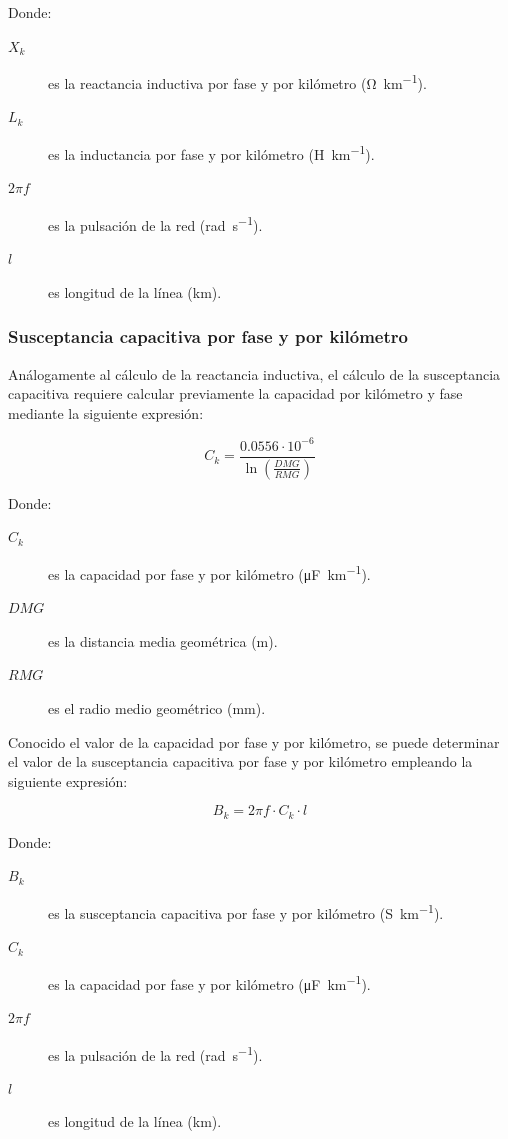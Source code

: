 Donde:
\begin{description}
  \item[$X_k$] es la reactancia inductiva por fase y por kilómetro (\si{\ohm\per\kilo\meter}).
  \item[$L_k$] es la inductancia por fase y por kilómetro (\si{\henry\per\kilo\meter}).
  \item[$2\pi f$] es la pulsación de la red (\si{\radian\per\second}).
  \item[$l$] es longitud de la línea (\si{\kilo\meter}).
\end{description}

\subsubsection{Susceptancia capacitiva por fase y por kilómetro}
\label{subsubsec:cdt-susceptancia}
Análogamente al cálculo de la reactancia inductiva, el cálculo de la susceptancia capacitiva requiere calcular previamente la capacidad por kilómetro y fase mediante la siguiente expresión:

\begin{equation}
\label{eq:cdt-capacidad}
C_k = \frac{0.0556 \cdot 10^{-6}}{\ln{(\frac{DMG}{RMG})}}
\end{equation}

Donde:
\begin{description}
  \item[$C_k$] es la capacidad por fase y por kilómetro (\si{\micro\farad\per\kilo\meter}).
  \item[$DMG$] es la distancia media geométrica (\si{\meter}).
  \item[$RMG$] es el radio medio geométrico (\si{\milli\meter}).
\end{description}

 Conocido el valor de la capacidad por fase y por kilómetro, se puede determinar el valor de la susceptancia capacitiva por fase y por kilómetro empleando la siguiente expresión:

\begin{equation}
\label{eq:cdt-susceptancia}
B_k = 2\pi f \cdot C_k \cdot l
\end{equation}

Donde:
\begin{description}
  \item[$B_k$] es la susceptancia capacitiva por fase y por kilómetro (\si{\siemens\per\kilo\meter}).
  \item[$C_k$] es la capacidad por fase y por kilómetro (\si{\micro\farad\per\kilo\meter}).
  \item[$2\pi f$] es la pulsación de la red (\si{\radian\per\second}).
  \item[$l$] es longitud de la línea (\si{\kilo\meter}).
\end{description}

